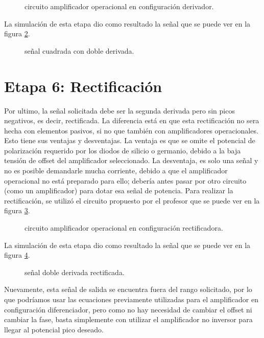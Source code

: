 \begin{figure}[!ht]
  \centering
  
  \caption{circuito amplificador operacional en configuración derivador.}
  \label{crkt:2do.derivador}
\end{figure}

La simulación de esta etapa dio como resultado la señal que se puede ver en la figura \ref{plot:2do.derivador}.

\begin{figure}[!ht]
  \centering
  
  \caption{señal cuadrada con doble derivada.}
  \label{plot:2do.derivador}
\end{figure}

\section{Etapa 6: Rectificación}
Por ultimo, la señal solicitada debe ser la segunda derivada pero sin picos negativos, es decir, rectificada. La
diferencia está en que esta rectificación no sera hecha con elementos pasivos, si no que también con amplificadores
operacionales. Esto tiene sus ventajas y desventajas. La ventaja es que se omite el potencial de polarización requerido
por los diodos de silicio o germanio, debido a la baja tensión de offset del amplificador seleccionado. La desventaja,
es solo una señal y no es posible demandarle mucha corriente, debido a que el amplificador operacional no está preparado
para ello; debería antes pasar por otro circuito (como un amplificador) para dotar esa señal de potencia. Para realizar la
rectificación, se utilizó el circuito propuesto por el profesor que se puede ver en la figura \ref{crkt:rectificador}.

\begin{figure}[!ht]
  \centering
  
  \caption{circuito amplificador operacional en configuración rectificadora.}
  \label{crkt:rectificador}
\end{figure}

La simulación de esta etapa dio como resultado la señal que se puede ver en la figura \ref{plot:rectified_pre}.

\begin{figure}[!ht]
  \centering
  
  \caption{señal doble derivada rectificada.}
  \label{plot:rectified_pre}
\end{figure}

Nuevamente, esta señal de salida se encuentra fuera del rango solicitado, por lo que podríamos usar las ecuaciones
previamente utilizadas para el amplificador en configuración diferenciador, pero como no hay necesidad de cambiar el
offset ni cambiar la fase, basta simplemente con utilizar el amplificador no inversor para llegar al potencial pico
deseado.

